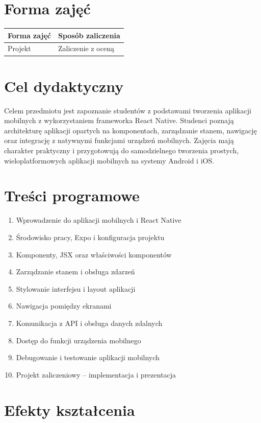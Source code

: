 \documentclass[12pt, a4paper]{article}
\begin{document}
\section{Forma zajęć}

\begin{tabular}{ll}
  \hline
  \textbf{Forma zajęć} & \textbf{Sposób zaliczenia} \\
  \hline
  Projekt & Zaliczenie z oceną \\
  \hline
\end{tabular}

\section{Cel dydaktyczny}

Celem przedmiotu jest zapoznanie studentów z podstawami tworzenia aplikacji mobilnych z wykorzystaniem frameworka React Native. Studenci poznają architekturę aplikacji opartych na komponentach, zarządzanie stanem, nawigację oraz integrację z natywnymi funkcjami urządzeń mobilnych. Zajęcia mają charakter praktyczny i przygotowują do samodzielnego tworzenia prostych, wieloplatformowych aplikacji mobilnych na systemy Android i iOS.

\section{Treści programowe}

\begin{enumerate}
  \item Wprowadzenie do aplikacji mobilnych i React Native
  \item Środowisko pracy, Expo i konfiguracja projektu
  \item Komponenty, JSX oraz właściwości komponentów
  \item Zarządzanie stanem i obsługa zdarzeń
  \item Stylowanie interfejsu i layout aplikacji
  \item Nawigacja pomiędzy ekranami
  \item Komunikacja z API i obsługa danych zdalnych
  \item Dostęp do funkcji urządzenia mobilnego
  \item Debugowanie i testowanie aplikacji mobilnych
  \item Projekt zaliczeniowy – implementacja i prezentacja
\end{enumerate}

\section{Efekty kształcenia}
\end{document}
